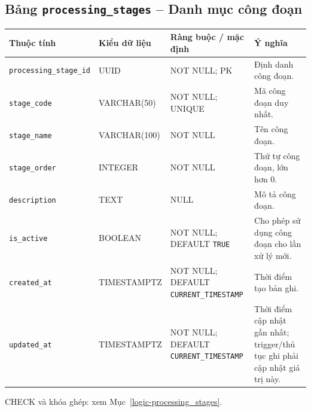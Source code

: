 \subsection{Bảng \texttt{processing\_\allowbreak{}stages} -- Danh mục công đoạn}
\label{dictionary-processing_stages}
\begingroup
\footnotesize
\setlength{\tabcolsep}{3pt}
\begin{longtable}{>{\raggedright\arraybackslash}p{3.1cm}>{\raggedright\arraybackslash}p{2.5cm}>{\raggedright\arraybackslash}p{3.7cm}>{\raggedright\arraybackslash}p{4.3cm}}
\toprule
Thuộc tính & Kiểu dữ liệu & Ràng buộc / mặc định & Ý nghĩa \\
\midrule
\endhead
\texttt{processing\_\allowbreak{}stage\_\allowbreak{}id} & UUID & NOT NULL; PK & Định danh công đoạn. \\
\texttt{stage\_\allowbreak{}code} & VARCHAR(50) & NOT NULL; UNIQUE & Mã công đoạn duy nhất. \\
\texttt{stage\_\allowbreak{}name} & VARCHAR(100) & NOT NULL & Tên công đoạn. \\
\texttt{stage\_\allowbreak{}order} & INTEGER & NOT NULL & Thứ tự công đoạn, lớn hơn 0. \\
\texttt{description} & TEXT & NULL & Mô tả công đoạn. \\
\texttt{is\_\allowbreak{}active} & BOOLEAN & NOT NULL; DEFAULT \texttt{TRUE} & Cho phép sử dụng công đoạn cho lần xử lý mới. \\
\texttt{created\_\allowbreak{}at} & TIMESTAMPTZ & NOT NULL; DEFAULT \texttt{CURRENT\_\allowbreak{}TIMESTAMP} & Thời điểm tạo bản ghi. \\
\texttt{updated\_\allowbreak{}at} & TIMESTAMPTZ & NOT NULL; DEFAULT \texttt{CURRENT\_\allowbreak{}TIMESTAMP} & Thời điểm cập nhật gần nhất; trigger/thủ tục ghi phải cập nhật giá trị này. \\
\bottomrule
\end{longtable}
\endgroup
CHECK và khóa ghép: xem Mục~\ref{logic-processing_stages}.
